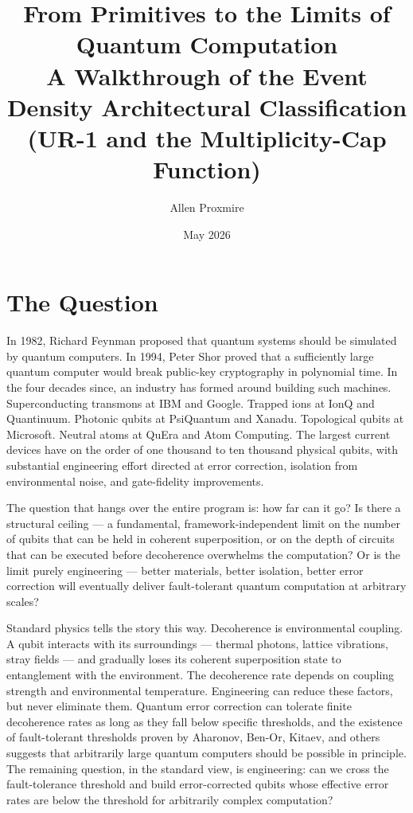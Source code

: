 \documentclass[11pt,a4paper]{article}
\title{\vspace{-1cm}\Large\bfseries From Primitives to the Limits of Quantum Computation\\[6pt]
\large\mdseries A Walkthrough of the Event Density Architectural Classification (UR-1 and the Multiplicity-Cap Function)}
\author{Allen Proxmire}
\date{May 2026}
\begin{document}
\maketitle
\thispagestyle{empty}

\section{The Question}

In 1982, Richard Feynman proposed that quantum systems should be simulated by quantum computers. In 1994, Peter Shor proved that a sufficiently large quantum computer would break public-key cryptography in polynomial time. In the four decades since, an industry has formed around building such machines. Superconducting transmons at IBM and Google. Trapped ions at IonQ and Quantinuum. Photonic qubits at PsiQuantum and Xanadu. Topological qubits at Microsoft. Neutral atoms at QuEra and Atom Computing. The largest current devices have on the order of one thousand to ten thousand physical qubits, with substantial engineering effort directed at error correction, isolation from environmental noise, and gate-fidelity improvements.

The question that hangs over the entire program is: how far can it go? Is there a structural ceiling --- a fundamental, framework-independent limit on the number of qubits that can be held in coherent superposition, or on the depth of circuits that can be executed before decoherence overwhelms the computation? Or is the limit purely engineering --- better materials, better isolation, better error correction will eventually deliver fault-tolerant quantum computation at arbitrary scales?

Standard physics tells the story this way. Decoherence is environmental coupling. A qubit interacts with its surroundings --- thermal photons, lattice vibrations, stray fields --- and gradually loses its coherent superposition state to entanglement with the environment. The decoherence rate depends on coupling strength and environmental temperature. Engineering can reduce these factors, but never eliminate them. Quantum error correction can tolerate finite decoherence rates as long as they fall below specific thresholds, and the existence of fault-tolerant thresholds proven by Aharonov, Ben-Or, Kitaev, and others suggests that arbitrarily large quantum computers should be possible in principle. The remaining question, in the standard view, is engineering: can we cross the fault-tolerance threshold and build error-corrected qubits whose effective error rates are below the threshold for arbitrarily complex computation?
\end{document}
